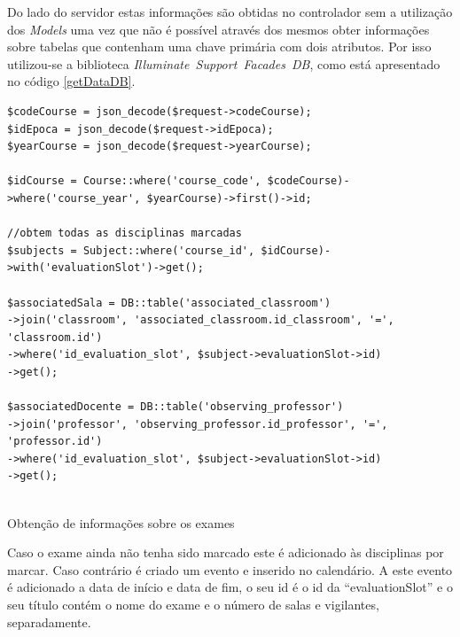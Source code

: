\documentclass[12pt, twoside]{report}
\begin{document}
Do lado do servidor estas informações são obtidas no controlador sem a utilização dos \textit{Models} uma vez que não é possível através dos mesmos obter informações sobre tabelas que contenham uma chave primária com dois atributos. Por isso utilizou-se a biblioteca \textit{Illuminate\ Support\ Facades\ DB}, como está apresentado no código \ref{getDataDB}.

	\begin{listing}[H]
	\begin{verbatim}
$codeCourse = json_decode($request->codeCourse);
$idEpoca = json_decode($request->idEpoca);
$yearCourse = json_decode($request->yearCourse);

$idCourse = Course::where('course_code', $codeCourse)->where('course_year', $yearCourse)->first()->id;

//obtem todas as disciplinas marcadas
$subjects = Subject::where('course_id', $idCourse)->with('evaluationSlot')->get();

$associatedSala = DB::table('associated_classroom')
->join('classroom', 'associated_classroom.id_classroom', '=', 'classroom.id')
->where('id_evaluation_slot', $subject->evaluationSlot->id)
->get();
		
$associatedDocente = DB::table('observing_professor')
->join('professor', 'observing_professor.id_professor', '=', 'professor.id')
->where('id_evaluation_slot', $subject->evaluationSlot->id)
->get();
		
\end{verbatim}
\caption{Obtenção de informações sobre os exames}
\label{getDataDB}
\end{listing}

 Caso o exame ainda não tenha sido marcado este é adicionado às disciplinas por marcar. Caso contrário é criado um evento e inserido no calendário. A este evento é adicionado a data de início e data de fim, o seu id é o id da ``evaluationSlot'' e o seu título contém o nome do exame e o número de salas e vigilantes, separadamente.
\end{document}
